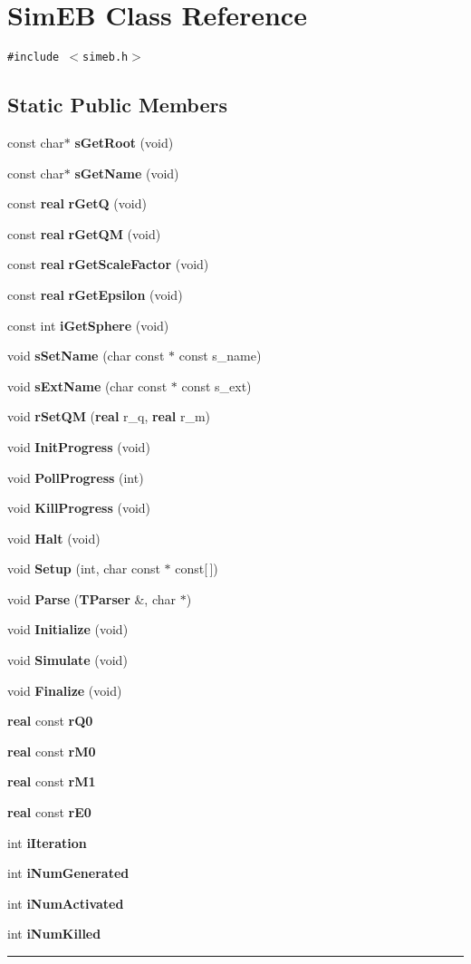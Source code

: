 \section{SimEB  Class Reference}
\label{SimEB}


{\tt \#include $<$simeb.h$>$}

\subsection*{Static Public Members}
\begin{CompactItemize}
\item 
const char$\ast$ {\bf s\-Get\-Root} (void)
\item 
const char$\ast$ {\bf s\-Get\-Name} (void)
\item 
const {\bf real} {\bf r\-Get\-Q} (void)
\item 
const {\bf real} {\bf r\-Get\-QM} (void)
\item 
const {\bf real} {\bf r\-Get\-Scale\-Factor} (void)
\item 
const {\bf real} {\bf r\-Get\-Epsilon} (void)
\item 
const int {\bf i\-Get\-Sphere} (void)
\item 
void {\bf s\-Set\-Name} (char const $\ast$ const s\_\-name)
\item 
void {\bf s\-Ext\-Name} (char const $\ast$ const s\_\-ext)
\item 
void {\bf r\-Set\-QM} ({\bf real} r\_\-q, {\bf real} r\_\-m)
\item 
void {\bf Init\-Progress} (void)
\item 
void {\bf Poll\-Progress} (int)
\item 
void {\bf Kill\-Progress} (void)
\item 
void {\bf Halt} (void)
\item 
void {\bf Setup} (int, char const $\ast$ const[$\,$])
\item 
void {\bf Parse} ({\bf TParser} \&, char $\ast$)
\item 
void {\bf Initialize} (void)
\item 
void {\bf Simulate} (void)
\item 
void {\bf Finalize} (void)
\item 
{\bf real} const {\bf r\-Q0}
\item 
{\bf real} const {\bf r\-M0}
\item 
{\bf real} const {\bf r\-M1}
\item 
{\bf real} const {\bf r\-E0}
\item 
int {\bf i\-Iteration}
\item 
int {\bf i\-Num\-Generated}
\item 
int {\bf i\-Num\-Activated}
\item 
int {\bf i\-Num\-Killed}
\end{CompactItemize}
\vspace{0.4cm}\hrule\vspace{0.2cm}
